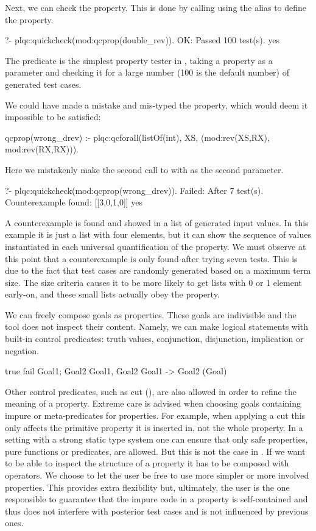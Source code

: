 Next, we can check the property.
%
This is done by calling \plqc{} using the alias
 to define the property.
\begin{yapcode}
   ?- plqc:quickcheck(mod:qcprop(double_rev)).
 OK: Passed 100 test(s).
 yes
\end{yapcode}
%
The  predicate is the simplest property tester in
\plqc{}, taking a property as a parameter and checking it for a large
number (100 is the default number) of generated test cases.


We could have made a mistake and mis-typed the property, which would deem
it impossible to be satisfied:
%
\begin{yapcode}
 qcprop(wrong_drev) :-
   plqc:qcforall(listOf(int), XS,
                 (mod:rev(XS,RX),
                  mod:rev(RX,RX))).
\end{yapcode}
%
Here we mistakenly make the second call to  with  as
the second parameter.
%
\begin{yapcode}
   ?- plqc:quickcheck(mod:qcprop(wrong_drev)).
 Failed: After 7 test(s).
 Counterexample found: [[3,0,1,0]] 
 yes
\end{yapcode}
A counterexample is found and showed in a list of generated input
values.
%
In this example it is just a list with four elements, but it can show
the sequence of values instantiated in each universal quantification of
the property.
%
We must observe at this point that a counterexample is only found
after trying seven tests.
%
This is due to the fact that test cases are randomly generated based on
a maximum term size.
%
The size criteria causes it to be more likely to get lists with 0 or 1
element early-on, and these small lists actually obey the property.


We can freely compose \Prolog{} goals as properties.
%
These goals are indivisible and the tool does not inspect their content.
%
Namely, we can make logical statements with built-in control predicates:
truth values, conjunction, disjunction, implication or negation.
%
\begin{yapcode}
   true
   fail
   Goal1; Goal2
   Goal1, Goal2
   Goal1 -> Goal2
   \+(Goal)
\end{yapcode}
%
Other control predicates, such as cut (\yap{!}), are also allowed in
order to refine the meaning of a property.
%
Extreme care is advised when choosing goals containing impure or
meta-predicates for properties.
%
For example, when applying a cut this only affects the primitive
property it is inserted in, not the whole property.
%
In a setting with a strong static type system one can ensure that only
safe properties, pure functions or predicates, are allowed.
%
But this is not the case in \Prolog{}.
%
If we want \plqc{} to be able to inspect the structure of a property
it has to be composed with \plqc{} operators.
%
We choose to let the user be free to use more simpler or more involved
properties.
%
This provides extra flexibility but, ultimately, the user
is the one responsible to guarantee that the impure code in a property
is self-contained and thus does not interfere with posterior test
cases and is not influenced by previous ones.


